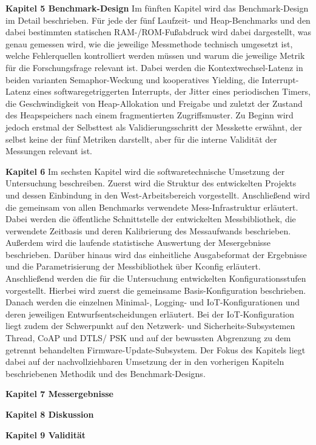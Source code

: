 \textbf{Kapitel 5 Benchmark-Design }Im fünften Kapitel wird das Benchmark-Design im Detail\textbf{ }beschrieben.\textbf{ }Für jede der fünf Laufzeit- und Heap-Benchmarks und den dabei bestimmten statischen RAM-/ROM-Fußabdruck wird dabei dargestellt, was genau gemessen wird, wie die jeweilige Messmethode technisch umgesetzt ist, welche Fehlerquellen kontrolliert werden müssen und warum die jeweilige Metrik für die Forschungsfrage relevant ist. Dabei werden die Kontextwechsel-Latenz in beiden varianten Semaphor-Weckung und kooperatives Yielding, die Interrupt-Latenz eines softwaregetriggerten Interrupts, der Jitter eines periodischen Timers, die Geschwindigkeit von Heap-Allokation und Freigabe und zuletzt der Zustand des Heapspeichers nach einem fragmentierten Zugriffsmuster. Zu Beginn wird jedoch erstmal der Selbsttest als Validierungsschritt der Messkette erwähnt, der selbst keine der fünf Metriken darstellt, aber für die interne Validität der Messungen relevant ist.\textbf{ }

\textbf{Kapitel 6 }Im sechsten Kapitel wird die softwaretechnische Umsetzung der Untersuchung beschreiben. Zuerst wird die Struktur des entwickelten Projekts und dessen Einbindung in den West-Arbeitsbereich vorgestellt. Anschließend wird die gemeinsam von allen Benchmarks verwendete Mess-Infrastruktur erläutert. Dabei werden die öffentliche Schnittstelle der entwickelten Messbibliothek, die verwendete Zeitbasis und deren Kalibrierung des Messaufwands beschrieben. Außerdem wird die laufende statistische Auswertung der Mesergebnisse beschrieben. Darüber hinaus wird das einheitliche Ausgabeformat der Ergebnisse und die Parametrisierung der Messbibliothek über Kconfig erläutert.\textbf{ }Anschließend werden die für die Untersuchung entwickelten Konfigurationsstufen vorgestellt. Hierbei wird zuerst die gemeinsame Basis-Konfiguration beschrieben. Danach werden die einzelnen Minimal-, Logging- und IoT-Konfigurationen und deren jeweiligen Entwurfsentscheidungen erläutert. Bei der IoT-Konfiguration liegt zudem der Schwerpunkt auf den Netzwerk- und Sicherheits-Subsystemen Thread, CoAP und DTLS/ PSK und auf der bewussten Abgrenzung zu dem getrennt behandelten Firmware-Update-Subsystem. Der Fokus des Kapitels liegt dabei auf der nachvollziehbaren Umsetzung der in den vorherigen Kapiteln beschriebenen Methodik und des Benchmark-Designs.

\textbf{Kapitel 7 Messergebnisse}

\textbf{Kapitel 8 Diskussion}

\textbf{Kapitel 9 Validität}

